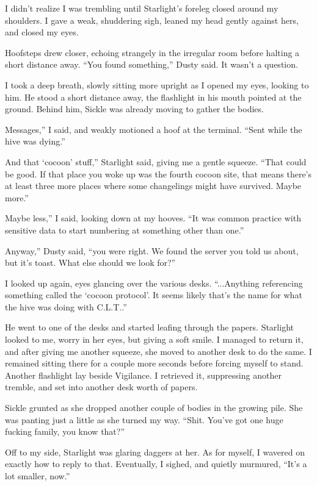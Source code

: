 I didn’t realize I was trembling until Starlight’s foreleg closed around my shoulders. I gave a weak, shuddering sigh, leaned my head gently against hers, and closed my eyes.

Hoofsteps drew closer, echoing strangely in the irregular room before halting a short distance away. “You found something,” Dusty said. It wasn’t a question.

I took a deep breath, slowly sitting more upright as I opened my eyes, looking to him. He stood a short distance away, the flashlight in his mouth pointed at the ground. Behind him, Sickle was already moving to gather the bodies.

\leavevmode{}Messages,” I said, and weakly motioned a hoof at the terminal. “Sent while the hive was dying.”

\leavevmode{}And that ‘cocoon’ stuff,” Starlight said, giving me a gentle squeeze. “That could be good. If that place you woke up was the fourth cocoon site, that means there’s at least three more places where some changelings might have survived. Maybe more.”

\leavevmode{}Maybe less,” I said, looking down at my hooves. “It was common practice with sensitive data to start numbering at something other than one.”

\leavevmode{}Anyway,” Dusty said, “you were right. We found the server you told us about, but it’s toast. What else should we look for?”

I looked up again, eyes glancing over the various desks. “...Anything referencing something called the ‘cocoon protocol’. It seems likely that’s the name for what the hive was doing with C.L.T..”

He went to one of the desks and started leafing through the papers. Starlight looked to me, worry in her eyes, but giving a soft smile. I managed to return it, and after giving me another squeeze, she moved to another desk to do the same. I remained sitting there for a couple more seconds before forcing myself to stand. Another flashlight lay beside Vigilance. I retrieved it, suppressing another tremble, and set into another desk worth of papers.

Sickle grunted as she dropped another couple of bodies in the growing pile. She was panting just a little as she turned my way. “Shit. You’ve got one huge fucking family, you know that?”

Off to my side, Starlight was glaring daggers at her. As for myself, I wavered on exactly how to reply to that. Eventually, I sighed, and quietly murmured, “It’s a lot smaller, now.”

